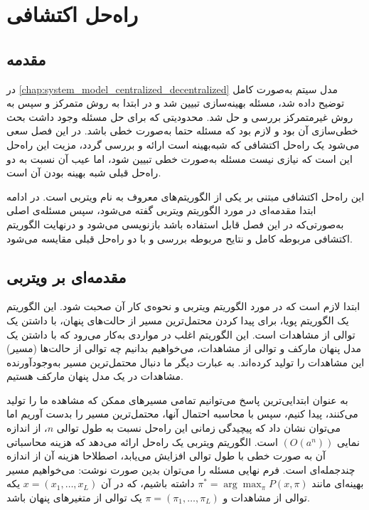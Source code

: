 \chapter{راه‌حل اکتشافی}\label{chap:heuristic}
\thispagestyle{empty}
\section{مقدمه}
	در \cref{chap:system_model_centralized_decentralized} مدل سیتم به‌صورت کامل توضیح داده شد، مسئله بهینه‌سازی تبیین شد و در ابتدا به روش متمرکز و سپس به روش غیرمتمرکز بررسی و حل شد. محدودیتی که برای حل مسئله وجود داشت بحث خطی‌سازی آن بود و لازم بود که مسئله حتما به‌صورت خطی باشد.
	 در این فصل سعی می‌شود یک راه‌حل اکتشافی که شبه‌بهینه است ارائه و بررسی گردد، مزیت این راه‌حل این است که نیازی نیست مسئله به‌صورت خطی تبیین شود، اما عیب آن نسبت به دو راه‌حل قبلی شبه بهینه بودن آن است. 
	 
	 این راه‌حل اکتشافی مبتنی بر یکی از الگوریتم‌های معروف به نام ویتربی است. در ادامه ابتدا مقدمه‌ای در مورد الگوریتم ویتربی گفته می‌شود، سپس مسئله‌ی اصلی به‌صورتی‌که در این فصل قابل استفاده باشد بازنویسی می‌شود و درنهایت الگوریتم اکتشافی مربوطه کامل و نتایح مربوطه بررسی و با دو راه‌حل قبلی مقایسه می‌شود. 
\section{مقدمه‌ای بر ویتربی}
	 ابتدا لازم است که در مورد الگوریتم ویتربی و نحوه‌ی کار آن صحبت شود. این الگوریتم یک الگوریتم پویا، برای پیدا کردن محتمل‌ترین مسیر از حالت‌های پنهان، با داشتن یک توالی از مشاهدات است. این الگوریتم اغلب در مواردی به‌کار می‌رود که با داشتن یک مدل پنهان مارکف و توالی‌ از مشاهدات، می‌خواهیم بدانیم چه توالی‌ از حالت‌ها (مسیر) این مشاهدات را تولید کرده‌اند. به عبارت دیگر ما دنبال محتمل‌ترین مسیر به‌وجودآورنده مشاهدات در یک مدل پنهان مارکف هستیم. 
	 
	 به عنوان ابتدایی‌ترین پاسخ می‌توانیم تمامی مسیرهای ممکن که مشاهده ما را تولید می‌کنند، پیدا کنیم، سپس با محاسبه احتمال آنها، محتمل‌ترین مسیر را بدست آوریم اما می‌توان نشان داد که پیچیدگی زمانی این راه‌حل نسبت به طول توالی $n$، از اندازه نمایی $(O(a^n))$ است. الگوریتم ویتربی یک راه‌حل ارائه می‌دهد که هزینه محاسباتی آن به صورت خطی با طول توالی افزایش می‌یابد، اصطلاحا هزینه آن از اندازه چندجمله‌ای است. فرم نهایی مسئله را می‌توان بدین صورت نوشت: می‌خواهیم مسیر بهینه‌ای مانند $\displaystyle \pi^* = \arg \max_\pi P(x,\pi)$ داشته باشیم، که در آن $x=(x_1, \dots, x_L)$ یکه توالی از مشاهدات و $\pi = (\pi_1, \dots, \pi_L)$ یک توالی از متغیرهای پنهان باشد. 
	 

